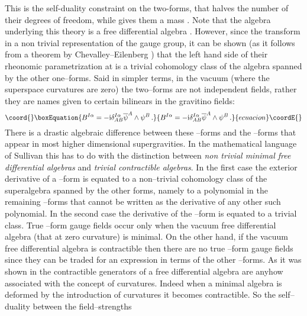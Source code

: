 \documentclass[a4paper,12pt]{article}
\def\bar{\overline}\end {picture}}
\begin{document}
This is the self-duality constraint on the two-forms, that halves
the number of  their degrees of freedom, while gives them a mass
\coordHE{}. Note that the algebra underlying this theory is a free
differential algebra \cite{sull,castdauriafre,Fre:1984pc}.
However, since the \coordHE{} transform in a non trivial
representation of the gauge group, it can be shown (as it follows
from a theorem by Chevalley--Eilenberg \cite{sull}) that the left
hand side of their rheonomic parametrization at
\coordHE{} is  a trivial cohomology class of the algebra
spanned by the other one--forms. Said in simpler terms, in the
vacuum (where the superspace curvatures are zero) the two--forms
are not independent fields, rather they are names given to certain
bilinears in the gravitino fields:
\begin{equation}\coord{}\boxEquation{
B^{I\alpha}=-{\rm
i}\delta^{I\alpha}_{AB}\bar{\psi}^A\wedge\psi^B\,.
}{
B^{I\alpha}=-{\rm
i}\delta^{I\alpha}_{AB}\bar{\psi}^A\wedge\psi^B\,.
}{ecuacion}\coordE{}\end{equation}
There is a drastic algebraic difference between these \coordHE{}--forms
and the \coordHE{}--forms that appear in most higher dimensional
supergravities. In the mathematical language of Sullivan
\cite{sull} this  has to do with the distinction between {\it non
trivial minimal free differential algebras} and {\it trivial
contractible algebras}. In the first case the exterior derivative
of a \coordHE{}--form is equated to a non--trivial cohomology class of
the superalgebra spanned by the other forms, namely to a
polynomial in the remaining  \coordHE{}--forms that cannot be written as
the derivative of any other such polynomial. In the second case
the derivative of the \coordHE{}--form is equated to a trivial class.
True \coordHE{}--form gauge fields occur only when  the vacuum free
differential algebra (that at zero curvature) is minimal. On the
other hand, if the vacuum free differential algebra is
contractible then there are no true \coordHE{}--form gauge fields since
they can be traded for an expression in terms of the other
\coordHE{}--forms. As it was shown in \cite{Fre:1984pc} the contractible
generators of a free differential algebra are anyhow associated
with the concept of curvatures. Indeed when a minimal algebra is
deformed by the introduction of curvatures it becomes
contractible. So the self--duality between the field--strengths
\end{document}
